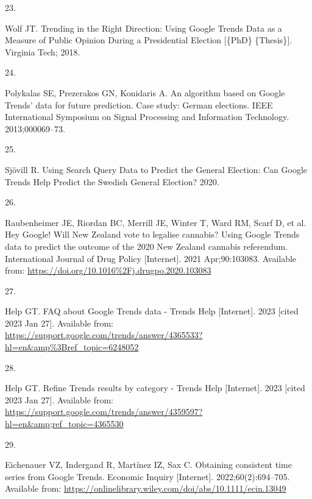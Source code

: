 \documentclass[
  letterpaper,
  DIV=11,
  numbers=noendperiod]{scrartcl}
\newlength{\cslhangindent}
\newlength{\csllabelwidth}
\newlength{\cslentryspacingunit} %
\newenvironment{CSLReferences}[2] %
 {%
  \setlength{\parindent}{0pt}
  \ifodd #1
  \let\oldpar\par
  \def\par{\hangindent=\cslhangindent\oldpar}
  \fi
  \setlength{\parskip}{#2\cslentryspacingunit}
 }%
 {}
\newcommand{\CSLLeftMargin}[1]{\parbox[t]{\csllabelwidth}{#1}}
\newcommand{\CSLRightInline}[1]{\parbox[t]{\linewidth - \csllabelwidth}{#1}\break}
\begin{document}
\begin{CSLReferences}{0}{0}
\leavevmode{}%
\CSLLeftMargin{23. }%
\CSLRightInline{Wolf JT. Trending in the {Right} {Direction}: {Using}
{Google} {Trends} {Data} as a {Measure} of {Public} {Opinion} {During} a
{Presidential} {Election} {[}\{PhD\} \{Thesis\}{]}. Virginia Tech; 2018.
}

\leavevmode{}%
\CSLLeftMargin{24. }%
\CSLRightInline{Polykalas SE, Prezerakos GN, Konidaris A. An algorithm
based on {Google} {Trends}' data for future prediction. {Case} study:
{German} elections. IEEE International Symposium on Signal Processing
and Information Technology. 2013;000069--73. }

\leavevmode{}%
\CSLLeftMargin{25. }%
\CSLRightInline{Sjövill R. Using {Search} {Query} {Data} to {Predict}
the {General} {Election}: {Can} {Google} {Trends} {Help} {Predict} the
{Swedish} {General} {Election}? 2020. }

\leavevmode{}%
\CSLLeftMargin{26. }%
\CSLRightInline{Raubenheimer JE, Riordan BC, Merrill JE, Winter T, Ward
RM, Scarf D, et al. Hey {Google}! Will {New} {Zealand} vote to legalise
cannabis? {Using} {Google} {Trends} data to predict the outcome of the
2020 {New} {Zealand} cannabis referendum. International Journal of Drug
Policy {[}Internet{]}. 2021 Apr;90:103083. Available from:
\url{https://doi.org/10.1016\%2Fj.drugpo.2020.103083}}

\leavevmode{}%
\CSLLeftMargin{27. }%
\CSLRightInline{Help GT. {FAQ} about {Google} {Trends} data - {Trends}
{Help} {[}Internet{]}. 2023 {[}cited 2023 Jan 27{]}. Available from:
\url{https://support.google.com/trends/answer/4365533?hl=en\&amp\%3Bref_topic=6248052}}

\leavevmode{}%
\CSLLeftMargin{28. }%
\CSLRightInline{Help GT. Refine {Trends} results by category - {Trends}
{Help} {[}Internet{]}. 2023 {[}cited 2023 Jan 27{]}. Available from:
\url{https://support.google.com/trends/answer/4359597?hl=en\&amp;ref_topic=4365530}}

\leavevmode{}%
\CSLLeftMargin{29. }%
\CSLRightInline{Eichenauer VZ, Indergand R, Martínez IZ, Sax C.
Obtaining consistent time series from {Google} {Trends}. Economic
Inquiry {[}Internet{]}. 2022;60(2):694--705. Available from:
\url{https://onlinelibrary.wiley.com/doi/abs/10.1111/ecin.13049}}


\end{CSLReferences}
\end{document}
